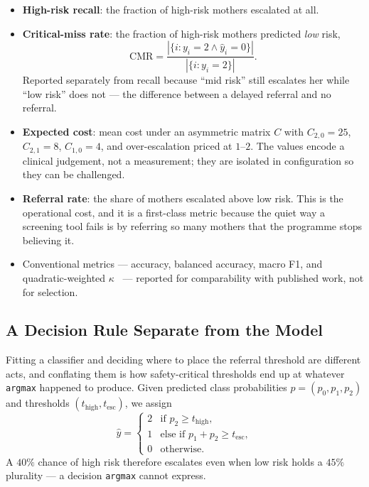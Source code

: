 \documentclass[journal]{IEEEtran}
\begin{document}
\begin{itemize}
\item \textbf{High-risk recall}: the fraction of high-risk mothers escalated at
all.
\item \textbf{Critical-miss rate}: the fraction of high-risk mothers predicted
\emph{low} risk,
\begin{equation}
\mathrm{CMR} = \frac{|\{i : y_i = 2 \wedge \hat{y}_i = 0\}|}{|\{i : y_i = 2\}|}.
\end{equation}
Reported separately from recall because ``mid risk'' still escalates her while
``low risk'' does not --- the difference between a delayed referral and no
referral.
\item \textbf{Expected cost}: mean cost under an asymmetric matrix $C$ with
$C_{2,0}=25$, $C_{2,1}=8$, $C_{1,0}=4$, and over-escalation priced at $1$--$2$.
The values encode a clinical judgement, not a measurement; they are isolated in
configuration so they can be challenged.
\item \textbf{Referral rate}: the share of mothers escalated above low risk.
This is the operational cost, and it is a first-class metric because the quiet
way a screening tool fails is by referring so many mothers that the programme
stops believing it.
\item Conventional metrics --- accuracy, balanced accuracy, macro F1, and
quadratic-weighted $\kappa$~\cite{cohen1968weighted} --- reported for
comparability with published work, not for selection.
\end{itemize}

\subsection{A Decision Rule Separate from the Model}
\label{sec:decision}

Fitting a classifier and deciding where to place the referral threshold are
different acts, and conflating them is how safety-critical thresholds end up at
whatever \texttt{argmax} happened to produce. Given predicted class
probabilities $p = (p_0, p_1, p_2)$ and thresholds $(t_{\mathrm{high}},
t_{\mathrm{esc}})$, we assign
\begin{equation}
\hat{y} =
\begin{cases}
2 & \text{if } p_2 \geq t_{\mathrm{high}},\\
1 & \text{else if } p_1 + p_2 \geq t_{\mathrm{esc}},\\
0 & \text{otherwise.}
\end{cases}
\end{equation}
A $40\%$ chance of high risk therefore escalates even when low risk holds a
$45\%$ plurality --- a decision \texttt{argmax} cannot express.
\end{document}
